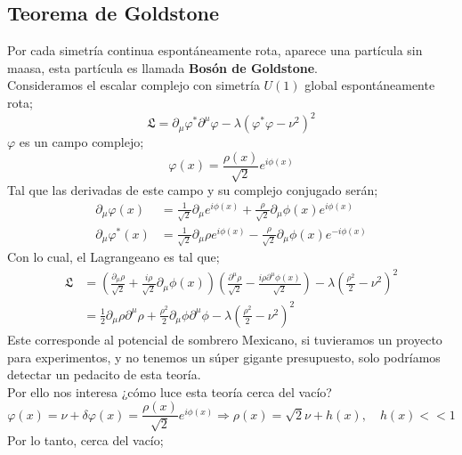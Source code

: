 \documentclass[../main.tex]{subfiles}
\begin{document}
  \subsection{Teorema de Goldstone}
  Por cada simetría continua espontáneamente rota, aparece una partícula sin maasa, esta partícula es llamada \textbf{Bosón de Goldstone}. \\
  Consideramos el escalar complejo con simetría $U(1)$ global espontáneamente rota;
  \begin{equation}
    \mathfrak{L} = \partial_\mu \varphi^* \partial^\mu \varphi - \lambda \left( \varphi^* \varphi - \nu^2 \right)^2
   \end{equation}
   $\varphi$ es un campo complejo;
\begin{equation}
  \varphi(x) = \frac{\rho(x)}{\sqrt{2}} e^{i\phi(x)}
 \end{equation}
 Tal que las derivadas de este campo y su complejo conjugado serán;
 \begin{align}
   \partial_\mu \varphi(x) & = \frac{1}{\sqrt{2}} \partial_\mu e^{i\phi(x)} + \frac{\rho}{\sqrt{2}} \partial_\mu \phi(x) e^{i\phi(x)} \\
   \partial_\mu \varphi^*(x) & = \frac{1}{\sqrt{2}} \partial_\mu \rho e^{i\phi(x)} - \frac{\rho}{\sqrt{2}} \partial_\mu \phi(x) e^{-i\phi(x)}
 \end{align} 
Con lo cual, el Lagrangeano es tal que;
\begin{align*}
  \mathfrak{L} & = \left( \frac{\partial_\mu\rho}{\sqrt{2}} + \frac{i\rho}{\sqrt{2}} \partial_\mu \phi(x) \right) \left( \frac{\partial^\mu \rho}{\sqrt{2}} - \frac{i\rho \partial^\mu \phi(x)}{\sqrt{2}} \right) - \lambda \left( \frac{\rho^2}{2} - \nu^2 \right)^2 \\
  & = \frac{1}{2} \partial_\mu \rho \partial^\mu \rho + \frac{\rho^2}{2} \partial_\mu \phi\partial^\mu \phi - \lambda \left( \frac{\rho^2}{2} - \nu^2 \right)^2
\end{align*}
Este corresponde al potencial de sombrero Mexicano, si tuvieramos un proyecto para experimentos, y no tenemos un súper gigante presupuesto, solo podríamos detectar un pedacito de esta teoría. \\
Por ello nos interesa ¿cómo luce esta teoría cerca del vacío?
\begin{equation}
  \varphi(x) = \nu + \delta \varphi(x) = \frac{\rho(x)}{\sqrt{2}} e^{i\phi(x)} \Rightarrow \rho(x) = \sqrt{2}\nu + h(x), \quad h(x)<<1
 \end{equation}
 Por lo tanto, cerca del vacío;
\end{document}
